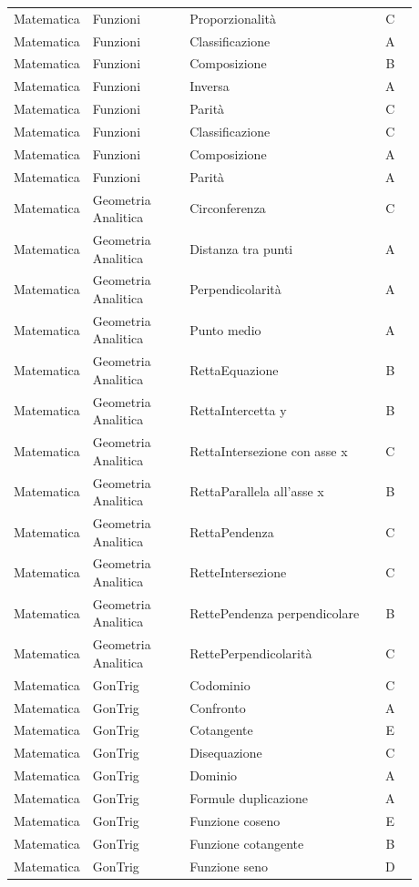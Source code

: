 \documentclass[20pt, a4paper]{article}
\begin{document}
\begin{longtable}{@{}>{\raggedright\arraybackslash}p{0.18\linewidth}>{\raggedright\arraybackslash}p{0.24\linewidth}>{\raggedright\arraybackslash}p{0.46\linewidth}c@{}}
Matematica & Funzioni & Proporzionalità & C \\
Matematica & Funzioni & Classificazione & A \\
Matematica & Funzioni & Composizione & B \\
Matematica & Funzioni & Inversa & A \\
Matematica & Funzioni & Parità & C \\
Matematica & Funzioni & Classificazione & C \\
Matematica & Funzioni & Composizione & A \\
Matematica & Funzioni & Parità & A \\
Matematica & Geometria Analitica & Circonferenza & C \\
Matematica & Geometria Analitica & Distanza tra punti & A \\
Matematica & Geometria Analitica & Perpendicolarità & A \\
Matematica & Geometria Analitica & Punto medio & A \\
Matematica & Geometria Analitica & RettaEquazione & B \\
Matematica & Geometria Analitica & RettaIntercetta y & B \\
Matematica & Geometria Analitica & RettaIntersezione con asse x & C \\
Matematica & Geometria Analitica & RettaParallela all'asse x & B \\
Matematica & Geometria Analitica & RettaPendenza & C \\
Matematica & Geometria Analitica & RetteIntersezione & C \\
Matematica & Geometria Analitica & RettePendenza perpendicolare & B \\
Matematica & Geometria Analitica & RettePerpendicolarità & C \\
Matematica & GonTrig & Codominio & C \\
Matematica & GonTrig & Confronto & A \\
Matematica & GonTrig & Cotangente & E \\
Matematica & GonTrig & Disequazione & C \\
Matematica & GonTrig & Dominio & A \\
Matematica & GonTrig & Formule duplicazione & A \\
Matematica & GonTrig & Funzione coseno & E \\
Matematica & GonTrig & Funzione cotangente & B \\
Matematica & GonTrig & Funzione seno & D \\

\end{longtable}
\end{document}
